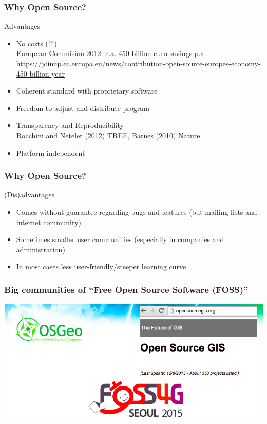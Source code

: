 \documentclass{beamer}
\begin{document}

\begin{frame}
\frametitle{Why Open Source?}
\begin{block}{Advantages}
\begin{itemize}
\item \alert{No costs (!!!)}\\
\small European Commision 2012: c.a. 450 billion euro savings p.a.
\href{https://joinup.ec.europa.eu/news/contribution-open-source-europes-economy-450-billion-year}{https://joinup.ec.europa.eu/news/contribution-open-source-europes-economy-450-billion-year}
\normalsize
\item \alert{Coherent standard with proprietary software}
\item \alert{Freedom to adjust and distribute program}
\item \alert{Transparency and Reproducibility}\\
\small Rocchini and Neteler (2012) TREE, Barnes (2010) Nature
\normalsize
\item \alert{Platform-independent}
\end{itemize}
\end{block}
\end{frame}


\begin{frame}
\frametitle{Why Open Source?}
\begin{block}{(Dis)advantages}
\begin{itemize}
\item Comes without guarantee regarding bugs and features (but mailing lists and internet community) 
\item Sometimes smaller user communities (especially in companies and administration)
\item In most cases less user-friendly/steeper learning curve
\end{itemize}
\end{block}
\end{frame}


\begin{frame}
\frametitle{Big communities of ``Free Open Source Software (FOSS)''}
\centering
\includegraphics[width=\textwidth]{Figures/FOSS.png}
\end{frame}
\end{document}
